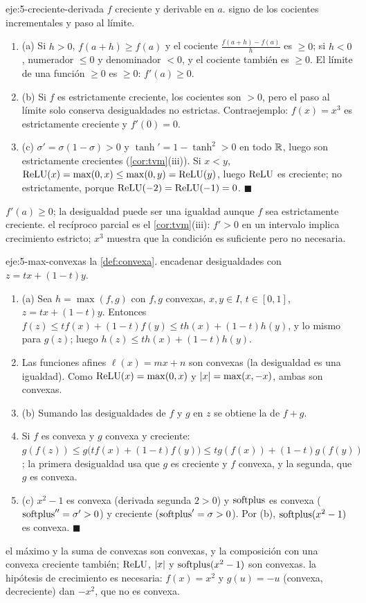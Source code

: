 \begin{solucion}{eje:5-creciente-derivada}
\datos $f$ creciente y derivable en $a$.
\planteamiento signo de los cocientes incrementales y paso al límite.
\pasos
\begin{enumerate}[label=\arabic*.]
  \item (a) Si $h>0$, $f(a+h)\ge f(a)$ y el cociente $\frac{f(a+h)-f(a)}{h}$ es $\ge0$; si $h<0$, numerador $\le0$ y denominador $<0$, y el cociente también es $\ge0$. El límite de una función $\ge0$ es $\ge0$: $f'(a)\ge0$.
  \item (b) Si $f$ es estrictamente creciente, los cocientes son $>0$, pero el paso al límite solo conserva desigualdades no estrictas. Contraejemplo: $f(x)=x^{3}$ es estrictamente creciente y $f'(0)=0$.
  \item (c) $\sigma'=\sigma(1-\sigma)>0$ y $\tanh'=1-\tanh^{2}>0$ en todo $\mathbb{R}$, luego son estrictamente crecientes (\cref{cor:tvm}(iii)). Si $x<y$, $\operatorname{ReLU}(x)=\max(0,x)\le\max(0,y)=\operatorname{ReLU}(y)$, luego $\operatorname{ReLU}$ es creciente; no estrictamente, porque $\operatorname{ReLU}(-2)=\operatorname{ReLU}(-1)=0$. \hfill$\blacksquare$
\end{enumerate}
\resultado $f'(a)\ge0$; la desigualdad puede ser una igualdad aunque $f$ sea estrictamente creciente.
\comprobacion el recíproco parcial es el \cref{cor:tvm}(iii): $f'>0$ en un intervalo implica crecimiento estricto; $x^{3}$ muestra que la condición es suficiente pero no necesaria.
\end{solucion}

\begin{solucion}{eje:5-max-convexas}
\datos la \cref{def:convexa}.
\planteamiento encadenar desigualdades con $z=tx+(1-t)y$.
\pasos
\begin{enumerate}[label=\arabic*.]
  \item (a) Sea $h=\max(f,g)$ con $f,g$ convexas, $x,y\in I$, $t\in[0,1]$, $z=tx+(1-t)y$. Entonces $f(z)\le tf(x)+(1-t)f(y)\le th(x)+(1-t)h(y)$, y lo mismo para $g(z)$; luego $h(z)\le th(x)+(1-t)h(y)$.
  \item Las funciones afines $\ell(x)=mx+n$ son convexas (la desigualdad es una igualdad). Como $\operatorname{ReLU}(x)=\max(0,x)$ y $\lvert x\rvert=\max(x,-x)$, ambas son convexas.
  \item (b) Sumando las desigualdades de $f$ y $g$ en $z$ se obtiene la de $f+g$.
  \item Si $f$ es convexa y $g$ convexa y creciente: $g(f(z))\le g\bigl(tf(x)+(1-t)f(y)\bigr)\le tg(f(x))+(1-t)g(f(y))$; la primera desigualdad usa que $g$ es creciente y $f$ convexa, y la segunda, que $g$ es convexa.
  \item (c) $x^{2}-1$ es convexa (derivada segunda $2>0$) y $\operatorname{softplus}$ es convexa ($\operatorname{softplus}''=\sigma'>0$) y creciente ($\operatorname{softplus}'=\sigma>0$). Por (b), $\operatorname{softplus}(x^{2}-1)$ es convexa. \hfill$\blacksquare$
\end{enumerate}
\resultado el máximo y la suma de convexas son convexas, y la composición con una convexa creciente también; $\operatorname{ReLU}$, $\lvert x\rvert$ y $\operatorname{softplus}(x^{2}-1)$ son convexas.
\comprobacion la hipótesis de crecimiento es necesaria: $f(x)=x^{2}$ y $g(u)=-u$ (convexa, decreciente) dan $-x^{2}$, que no es convexa.
\end{solucion}

